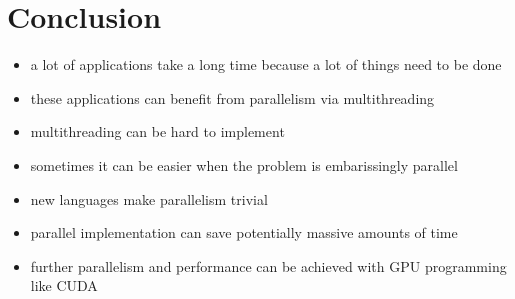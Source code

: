 \documentclass{article}
\begin{document}
\section{Conclusion}

    \begin{itemize}
        \item a lot of applications take a long time because a lot of things need to be done
        \item these applications can benefit from parallelism via multithreading
        \item multithreading can be hard to implement
        \item sometimes it can be easier when the problem is embarissingly parallel
        \item new languages make parallelism trivial
        \item parallel implementation can save potentially massive amounts of time
        \item further parallelism and performance can be achieved with GPU programming like CUDA
    \end{itemize}
\end{document}
